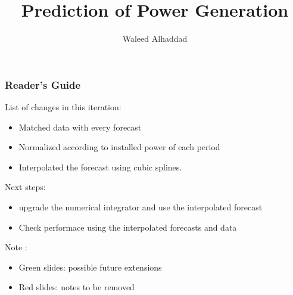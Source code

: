 \documentclass[aspectratio=169]{beamer}\usepackage[utf8]{inputenc}
\title{Prediction of Power Generation}
\subtitle{ Waleed Alhaddad}
\begin{document}
\begin{frame}
\titlepage
\end{frame}
%
%
%
%


\begin{frame}[label=guide]\frametitle{ Reader's Guide }

List of changes in this iteration:
\begin{itemize}
\item Matched data with every forecast
\item Normalized according to installed power of each period
\item Interpolated the forecast using cubic splines.

\end{itemize}

Next steps:
\begin{itemize}
\item upgrade the numerical integrator and use the interpolated forecast
\item Check performace using the interpolated forecasts and data
\end{itemize}

Note :
\begin{itemize}
\item Green slides: possible future extensions
\item Red slides: notes to be removed
\end{itemize}

\end{frame}
\end{document}
